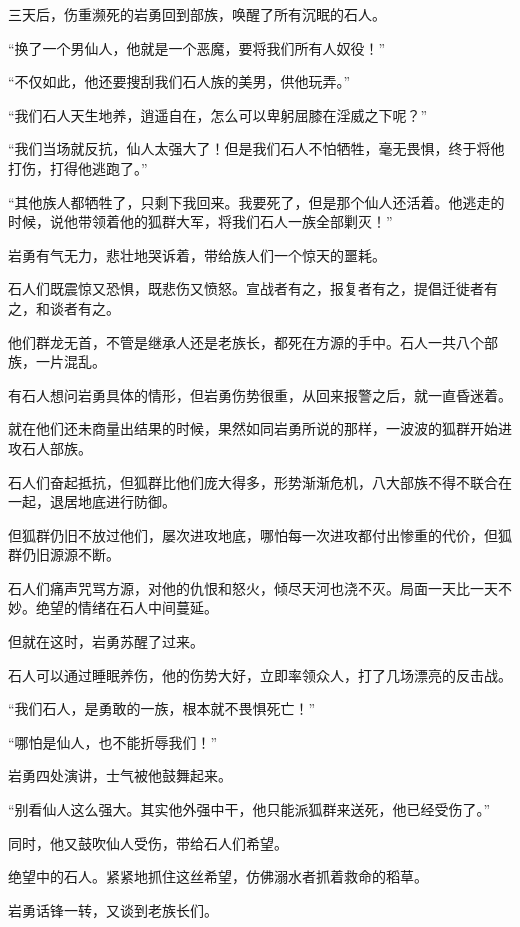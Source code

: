 
\begin{this_body}

三天后，伤重濒死的岩勇回到部族，唤醒了所有沉眠的石人。

“换了一个男仙人，他就是一个恶魔，要将我们所有人奴役！”

“不仅如此，他还要搜刮我们石人族的美男，供他玩弄。”

“我们石人天生地养，逍遥自在，怎么可以卑躬屈膝在淫威之下呢？”

“我们当场就反抗，仙人太强大了！但是我们石人不怕牺牲，毫无畏惧，终于将他打伤，打得他逃跑了。”

“其他族人都牺牲了，只剩下我回来。我要死了，但是那个仙人还活着。他逃走的时候，说他带领着他的狐群大军，将我们石人一族全部剿灭！”

岩勇有气无力，悲壮地哭诉着，带给族人们一个惊天的噩耗。

石人们既震惊又恐惧，既悲伤又愤怒。宣战者有之，报复者有之，提倡迁徙者有之，和谈者有之。

他们群龙无首，不管是继承人还是老族长，都死在方源的手中。石人一共八个部族，一片混乱。

有石人想问岩勇具体的情形，但岩勇伤势很重，从回来报警之后，就一直昏迷着。

就在他们还未商量出结果的时候，果然如同岩勇所说的那样，一波波的狐群开始进攻石人部族。

石人们奋起抵抗，但狐群比他们庞大得多，形势渐渐危机，八大部族不得不联合在一起，退居地底进行防御。

但狐群仍旧不放过他们，屡次进攻地底，哪怕每一次进攻都付出惨重的代价，但狐群仍旧源源不断。

石人们痛声咒骂方源，对他的仇恨和怒火，倾尽天河也浇不灭。局面一天比一天不妙。绝望的情绪在石人中间蔓延。

但就在这时，岩勇苏醒了过来。

石人可以通过睡眠养伤，他的伤势大好，立即率领众人，打了几场漂亮的反击战。

“我们石人，是勇敢的一族，根本就不畏惧死亡！”

“哪怕是仙人，也不能折辱我们！”

岩勇四处演讲，士气被他鼓舞起来。

“别看仙人这么强大。其实他外强中干，他只能派狐群来送死，他已经受伤了。”

同时，他又鼓吹仙人受伤，带给石人们希望。

绝望中的石人。紧紧地抓住这丝希望，仿佛溺水者抓着救命的稻草。

岩勇话锋一转，又谈到老族长们。


\end{this_body}
